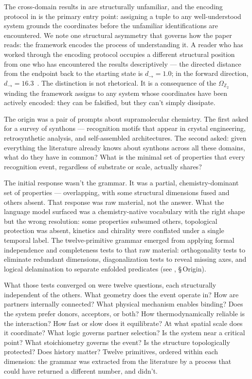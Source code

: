 \documentclass[12pt,a4paper]{article}
\newcommand{\OmegaZtwo}{\Omega_{\mathbb{Z}_2}}
\begin{document}
The cross-domain results in  are structurally
unfamiliar, and the encoding protocol in  is the
primary entry point: assigning a tuple to any well-understood system
grounds the coordinates before the unfamiliar identifications are
encountered. We note one structural asymmetry that governs how the
paper reads: the framework encodes the process of understanding it.
A reader who has worked through the encoding protocol occupies a
different structural position from one who has encountered the
results descriptively --- the directed distance from the endpoint
back to the starting state is $d_\to = 1.0$; in the forward
direction, $d_\to = 16.3$~\cite{juster1961}. The distinction is
not rhetorical. It is a consequence of the $\OmegaZtwo$ winding
the framework assigns to any system whose coordinates have been
actively encoded: they can be falsified, but they can't simply
dissipate.

The origin was a pair of prompts about supramolecular chemistry. The
first asked for a survey of synthons --- recognition motifs that appear
in crystal engineering, retrosynthetic analysis, and self-assembled
architectures. The second asked: given everything the literature
already knows about synthons across all these domains, what do they
have in common? What is the minimal set of properties that every
recognition event, regardless of substrate or scale, actually shares?

The initial response wasn't the grammar. It was a partial, chemistry-dominant
set of properties --- overlapping, with some structural dimensions fused and
others absent. That response was raw material, not the answer. What the
language model surfaced was a chemistry-native vocabulary with the right
shape but the wrong resolution: some properties subsumed others, topological
protection was absent, kinetics and chirality were conflated under a single
temporal label. The twelve-primitive grammar emerged from applying formal
independence and completeness tests to that raw material: orthogonality tests
to eliminate redundant dimensions, diagonalization tests to reveal missing
axes, and logical delamination to separate enfolded predicates
(see , \S\,Origin).

What those tests converged on were twelve questions, each structurally
independent of the others. What geometry does the event operate in? How
are partners internally connected? What physical mechanism enables binding?
Does the system prefer donors, acceptors, or both? How thermodynamically
reliable is the interaction? How fast or slow does it equilibrate? At what
spatial scale does it coordinate? What logic governs partner selection? Is
the system near a critical point? What stoichiometry governs the event? Is
the structure topologically protected? Does history matter? Twelve
primitives, ordered within each dimension: the grammar was extracted from
the literature by a process that could have returned a different number, and
didn't.
\end{document}

